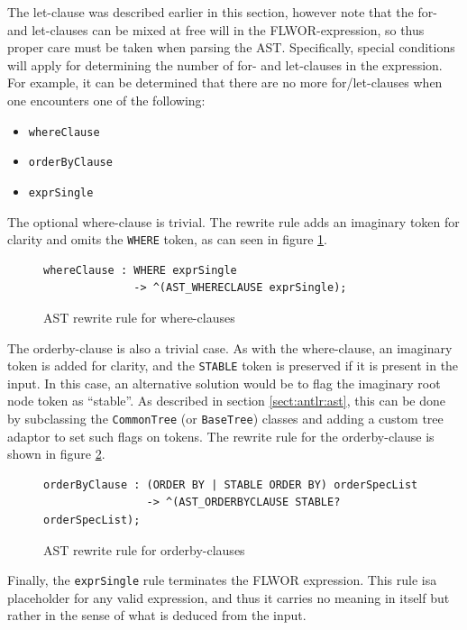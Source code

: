 The let-clause was described earlier in this section, however note that the for-
and let-clauses can be mixed at free will in the FLWOR-expression, so thus
proper care must be taken when parsing the AST. Specifically, special conditions
will apply for determining the number of for- and let-clauses in the expression.
For example, it can be determined that there are no more for/let-clauses when
one encounters one of the following:
\begin{itemize}
  \item \verb!whereClause!
  \item \verb!orderByClause!
  \item \verb!exprSingle!
\end{itemize}

The optional where-clause is trivial. The rewrite rule adds an imaginary
token for clarity and omits the \verb!WHERE! token, as can seen in figure
\ref{code:ast:whereclause}.

\begin{figure}[h]
\begin{verbatim} 
whereClause : WHERE exprSingle
              -> ^(AST_WHERECLAUSE exprSingle);
\end{verbatim}
\caption{AST rewrite rule for where-clauses}
\label{code:ast:whereclause}
\end{figure}

The orderby-clause is also a trivial case. As with the where-clause, an
imaginary token is added for clarity, and the \verb!STABLE! token is preserved
if it is present in the input. In this case, an alternative solution would be to
flag the imaginary root node token as ``stable''. As described in section 
\ref{sect:antlr:ast}, this can be done by subclassing the \verb!CommonTree! (or
\verb!BaseTree!) classes and adding a custom tree adaptor to set such flags on
tokens. The rewrite rule for the orderby-clause is shown in figure
\ref{code:ast:orderbyclause}.

\begin{figure}[h]
\begin{verbatim} 
orderByClause : (ORDER BY | STABLE ORDER BY) orderSpecList
                -> ^(AST_ORDERBYCLAUSE STABLE? orderSpecList);
\end{verbatim}
\caption{AST rewrite rule for orderby-clauses}
\label{code:ast:orderbyclause}
\end{figure}

Finally, the \verb!exprSingle! rule terminates the FLWOR expression. This rule
isa placeholder for any valid expression, and thus it carries no meaning in
itself but rather in the sense of what is deduced from the input.

